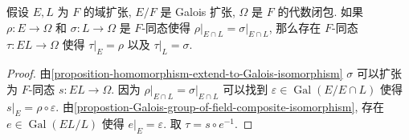 \begin{corollary}
  假设 \( E, L \) 为 \( F \) 的域扩张, \( E/F \) 是 Galois 扩张, \( \Omega \) 是
  \( F \) 的代数闭包.
  如果 \( \rho: E \to \Omega \) 和 \( \sigma: L \to \Omega \) 是 \( F
  \)-同态使得 \( \left. \rho \right\vert_{E \cap L} = \left. \sigma
  \right\vert_{E \cap L} \), 那么存在 \( F \)-同态 \( \tau: EL \to \Omega \)
  使得 \( \left. \tau \right\vert_{E} =\rho \) 以及 \( \left. \tau
  \right\vert_{L} = \sigma \).
\end{corollary}
\begin{proof}
  由\cref{proposition-homomorphism-extend-to-Galois-isomorphism} \( \sigma \)
  可以扩张为 \( F \)-同态 \( s: EL \to \Omega \).
  因为 \( \left. \rho \right\vert_{E \cap L} = \left. \sigma \right\vert_{E \cap
  L} \) 可以找到 \( \varepsilon \in \operatorname{Gal}(E/ E \cap L) \) 使得 \(
  \left. s \right\vert_{E} = \rho \circ \varepsilon \).
  由\cref{propostion-Galois-group-of-field-composite-isomorphism}, 存在 \( e \in
  \operatorname{Gal}(EL/L) \) 使得 \( \left. e \right\vert_{E} = \varepsilon \).
  取 \( \tau = s \circ e^{-1} \).
\end{proof}
